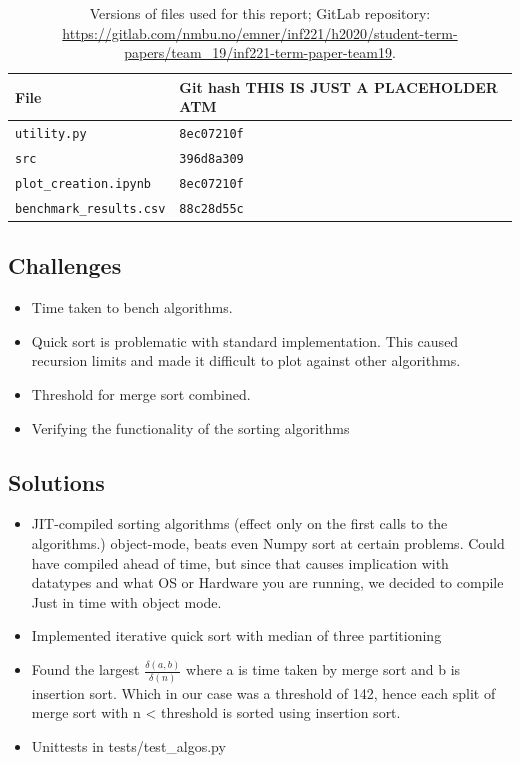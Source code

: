 \documentclass[sigconf, nonacm, natbib, screen, balance=False]{acmart}
\begin{document}
\begin{table}
  \caption{Versions of files used for this report; GitLab repository: \url{https://gitlab.com/nmbu.no/emner/inf221/h2020/student-term-papers/team_19/inf221-term-paper-team19}.}
  \label{tab:hashes}
  \begin{tabular}{ll}
    \hline
    File & Git hash THIS IS JUST A PLACEHOLDER ATM \\\hline
    \verb!utility.py! & \verb!8ec07210f! \\
    \verb!src! & \verb!396d8a309! \\
    \verb!plot_creation.ipynb! & \verb!8ec07210f! \\
    \verb!benchmark_results.csv! & \verb!88c28d55c! \\\hline
  \end{tabular}
\end{table}

\subsection{Challenges}\label{sec:challenges}

\begin{itemize}
\item Time taken to bench algorithms.
\item Quick sort is problematic with standard implementation. This caused recursion limits and made it difficult to plot against other algorithms. 
\item Threshold for merge sort combined.
\item Verifying the functionality of the sorting algorithms

\end{itemize}

\subsection{Solutions}\label{sec:solutions}
\begin{itemize}
\item JIT-compiled sorting algorithms (effect only on the first calls to the algorithms.) object-mode, beats even Numpy sort at certain problems. Could have compiled ahead of time, but since that causes implication with datatypes and what OS or Hardware you are running, we decided to compile Just in time with object mode. 
\item Implemented iterative quick sort with median of three partitioning 
\item Found the largest $\frac{\delta(a, b)}{\delta(n)}$ where a is time taken by merge sort and b is insertion sort. Which in our case was a threshold of 142, hence each split of merge sort with n < threshold is sorted using insertion sort.
\item Unittests in tests/test\_algos.py

\end{itemize}
\end{document}
